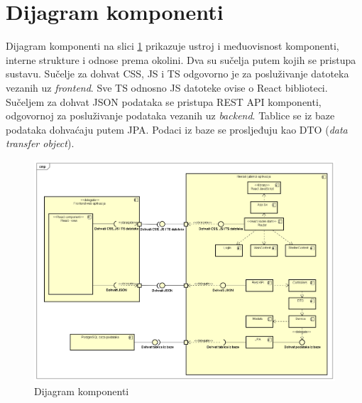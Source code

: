 			\eject
		
		\section{Dijagram komponenti}
		
			Dijagram komponenti na slici \ref{dijagram_komponenti} prikazuje ustroj i međuovisnost komponenti, interne strukture i odnose prema okolini. Dva su sučelja putem kojih se pristupa sustavu. Sučelje za dohvat CSS, JS i TS odgovorno je za posluživanje datoteka vezanih uz \textit{frontend}. Sve TS odnosno JS datoteke ovise o React biblioteci. Sučeljem za dohvat JSON podataka se pristupa REST API komponenti, odgovornoj za posluživanje podataka vezanih uz \textit{backend}. Tablice se iz baze podataka dohvaćaju putem JPA. Podaci iz baze se prosljeđuju kao DTO (\textit{data transfer object}).
			 
			 \begin{figure}[H]
				\includegraphics[scale=0.4]{slike/dijagram_komponenti.PNG} 
				\centering
				\caption{Dijagram komponenti}
				\label{dijagram_komponenti}
			\end{figure}